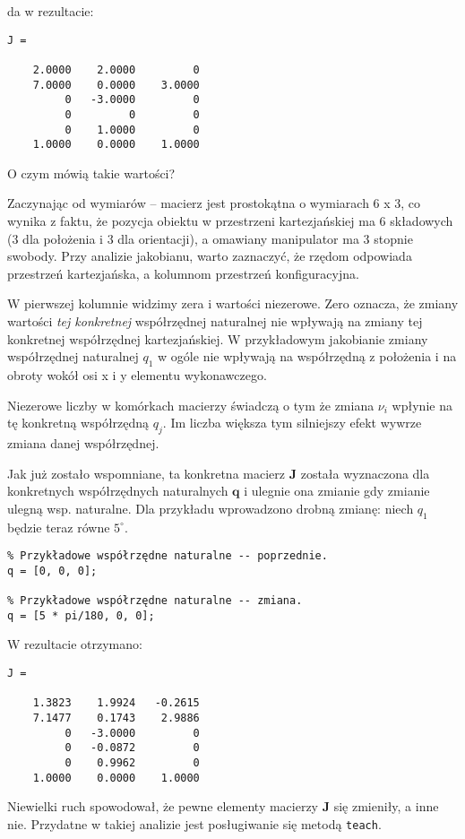 \documentclass[11pt, a4paper]{article}
\newcommand{\vectorQ}{$\mathbf{q}$}
\begin{document}
da w rezultacie:
\begin{lstlisting}[numbers = none]
J =

    2.0000    2.0000         0
    7.0000    0.0000    3.0000
         0   -3.0000         0
         0         0         0
         0    1.0000         0
    1.0000    0.0000    1.0000
\end{lstlisting}

O czym mówią takie wartości?

Zaczynając od wymiarów -- macierz jest prostokątna o wymiarach 6 x 3, co wynika z faktu, że pozycja obiektu w przestrzeni kartezjańskiej ma 6 składowych (3 dla położenia i 3 dla orientacji), a omawiany manipulator ma 3 stopnie swobody. Przy analizie jakobianu, warto zaznaczyć, że rzędom odpowiada przestrzeń kartezjańska, a kolumnom przestrzeń konfiguracyjna.

W pierwszej kolumnie widzimy zera i wartości niezerowe. Zero oznacza, że zmiany wartości \emph{tej konkretnej} współrzędnej naturalnej nie wpływają na zmiany tej konkretnej współrzędnej kartezjańskiej. W przykładowym jakobianie zmiany współrzędnej naturalnej $q_1$ w ogóle nie wpływają na współrzędną z położenia i na obroty wokół osi x i y elementu wykonawczego.

Niezerowe liczby w komórkach macierzy świadczą o tym że zmiana $\nu_i$ wpłynie na tę konkretną współrzędną $q_j$. Im liczba większa tym silniejszy efekt wywrze zmiana danej współrzędnej.

Jak już zostało wspomniane, ta konkretna macierz $\mathbf{J}$ została wyznaczona dla konkretnych współrzędnych naturalnych \vectorQ{} i ulegnie ona zmianie gdy zmianie ulegną wsp. naturalne. Dla przykładu wprowadzono drobną zmianę: niech $q_1$ będzie teraz równe $5^{\circ}$.
\begin{lstlisting}
% Przykładowe współrzędne naturalne -- poprzednie.
q = [0, 0, 0];

% Przykładowe współrzędne naturalne -- zmiana.
q = [5 * pi/180, 0, 0];
\end{lstlisting}

W rezultacie otrzymano:
\begin{lstlisting}[numbers = none]
J =

    1.3823    1.9924   -0.2615
    7.1477    0.1743    2.9886
         0   -3.0000         0
         0   -0.0872         0
         0    0.9962         0
    1.0000    0.0000    1.0000
\end{lstlisting}

Niewielki ruch spowodował, że pewne elementy macierzy $\mathbf{J}$ się zmieniły, a inne nie. Przydatne w takiej analizie jest posługiwanie się metodą \texttt{teach}.
\end{document}
